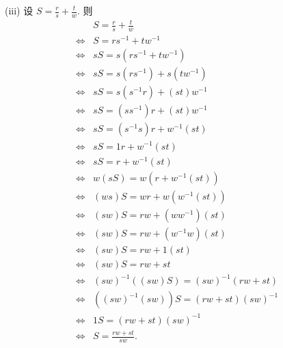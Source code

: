 \begin{pf}
    (iii) 设 $S = \frac{r}{s} + \frac{t}{w}$. 则
    \begin{align*}
                & S = \frac{r}{s} + \frac{t}{w}            \\
        \iff {} & S = rs^{-1} + tw^{-1}                    \\
        \iff {} & sS = s(rs^{-1} + tw^{-1})                \\
        \iff {} & sS = s(rs^{-1}) + s(tw^{-1})             \\
        \iff {} & sS = s(s^{-1}r) + (st)w^{-1}             \\
        \iff {} & sS = (ss^{-1}) r + (st) w^{-1}           \\
        \iff {} & sS = (s^{-1}s) r + w^{-1} (st)           \\
        \iff {} & sS = 1r + w^{-1} (st)                    \\
        \iff {} & sS = r + w^{-1} (st)                     \\
        \iff {} & w(sS) = w(r + w^{-1} (st))               \\
        \iff {} & (ws)S = wr + w(w^{-1} (st))              \\
        \iff {} & (sw)S = rw + (ww^{-1}) (st)              \\
        \iff {} & (sw)S = rw + (w^{-1}w) (st)              \\
        \iff {} & (sw)S = rw + 1(st)                       \\
        \iff {} & (sw)S = rw + st                          \\
        \iff {} & (sw)^{-1} ((sw) S) = (sw)^{-1} (rw + st) \\
        \iff {} & ((sw)^{-1} (sw)) S = (rw + st) (sw)^{-1} \\
        \iff {} & 1S = (rw + st)(sw)^{-1}                  \\
        \iff {} & S = \frac{rw + st}{sw}.
    \end{align*}


\end{pf}
